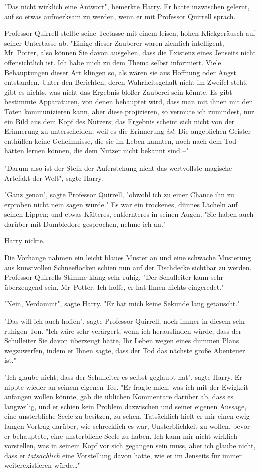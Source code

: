 {"Das nicht wirklich eine Antwort", bemerkte Harry. Er hatte inzwischen gelernt, auf so etwas aufmerksam zu werden, wenn er mit Professor Quirrell sprach.

Professor Quirrell stellte seine Teetasse mit einem leisen, hohen Klickgeräusch auf seiner Untertasse ab. "Einige dieser Zauberer waren ziemlich intelligent, Mr~Potter, also können Sie davon ausgehen, dass die Existenz eines Jenseits nicht offensichtlich ist. Ich habe mich zu dem Thema selbst informiert. Viele Behauptungen dieser Art klingen so, als wären sie aus Hoffnung oder Angst entstanden. Unter den Berichten, deren Wahrheitsgehalt nicht im Zweifel steht, gibt es nichts, was nicht das Ergebnis bloßer Zauberei sein könnte. Es gibt bestimmte Apparaturen, von denen behauptet wird, dass man mit ihnen mit den Toten kommunizieren kann, aber diese projizieren, so vermute ich zumindest, nur ein Bild aus dem Kopf des Nutzers; das Ergebnis scheint sich nicht von der Erinnerung zu unterscheiden, weil es die Erinnerung \emph{ist}. Die angeblichen Geister enthüllen keine Geheimnisse, die sie im Leben kannten, noch nach dem Tod hätten lernen können, die dem Nutzer nicht bekannt sind --"

"Darum also ist der Stein der Auferstehung nicht das wertvollste magische Artefakt der Welt", sagte Harry.

"Ganz genau", sagte Professor Quirrell, "obwohl ich zu einer Chance ihn zu erproben nicht nein sagen würde." Es war ein trockenes, dünnes Lächeln auf seinen Lippen; und etwas Kälteres, entfernteres in seinen Augen. "Sie haben auch darüber mit Dumbledore gesprochen, nehme ich an."

Harry nickte.

Die Vorhänge nahmen ein leicht blaues Muster an und eine schwache Musterung aus kunstvollen Schneeflocken schien nun auf der Tischdecke sichtbar zu werden. Professor Quirrells Stimme klang sehr ruhig. "Der Schulleiter kann sehr überzeugend sein, Mr~Potter. Ich hoffe, er hat Ihnen nichts eingeredet."

"Nein, Verdammt", sagte Harry. "Er hat mich keine Sekunde lang getäuscht."

"Das will ich auch hoffen", sagte Professor Quirrell, noch immer in diesem sehr ruhigen Ton. "Ich wäre sehr verärgert, wenn ich herausfinden würde, dass der Schulleiter Sie davon überzeugt hätte, Ihr Leben wegen eines dummen Plans wegzuwerfen, indem er Ihnen sagte, dass der Tod das nächste große Abenteuer ist."

"Ich glaube nicht, dass der Schulleiter es selbst geglaubt hat", sagte Harry. Er nippte wieder an seinem eigenen Tee. "Er fragte mich, was ich mit der Ewigkeit anfangen wollen könnte, gab die üblichen Kommentare darüber ab, dass es langweilig, und er schien kein Problem dazwischen und seiner eigenen Aussage, eine unsterbliche Seele zu besitzen, zu sehen. Tatsächlich hielt er mir einen ewig langen Vortrag darüber, wie schrecklich es war, Unsterblichkeit zu wollen, bevor er behauptete, eine unsterbliche Seele zu haben. Ich kann mir nicht wirklich vorstellen, was in seinem Kopf vor sich gegangen sein muss, aber ich glaube nicht, dass er \emph{tatsächlich} eine Vorstellung davon hatte, wie er im Jenseits für immer weiterexistieren würde…"

}
